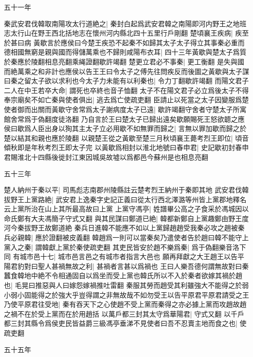 五十一年


秦武安君伐韓取南陽攻太行道絶之|{
	秦封白起爲武安君韓之南陽即河内野王之地班志太行山在野王西北括地志在懷州河内縣北四十五里行戶剛翻}
楚頃襄王疾病|{
	疾至於甚曰病}
黃歇言於應侯曰今楚王疾恐不起秦不如歸其太子太子得立其事秦必重而德相國無窮是親與國而得儲萬乘也不歸則咸陽布衣耳|{
	四十三年黃歇與楚太子爲質於秦應於陵翻相息亮翻乘䋲證翻歇許竭翻}
楚更立君必不事秦|{
	更工衡翻}
是失與國而絶萬乘之和非計也應侯以告王王曰令太子之傅先往問疾反而後圖之黃歇與太子謀曰秦之留太子欲以求利也今太子力未能有以利秦也|{
	令力丁翻歇許竭翻}
而陽文君子二人在中王若卒大命|{
	謂死也卒終也音子恤翻}
太子不在陽文君子必立爲後太子不得奉宗廟矣不如亡秦與使者俱出|{
	逃去爲亡使疏吏翻}
臣請止以死當之太子因變服爲楚使者御而出關而黃歇守舍常爲太子謝病度太子已遠|{
	歇許竭翻守舍者守楚太子所寓館舍常爲于偽翻度徒洛翻}
乃自言於王曰楚太子已歸出遠矣歇願賜死王怒欲聼之應侯曰歇爲人臣出身以狥其主太子立必用歇不如無罪而歸之|{
	言無以罪加歇而歸之於楚以結其和親也應於陵翻}
以親楚王從之黃歇至楚三月秋頃襄王薨考烈王即位|{
	頃音傾秋即是年秋考烈王即太子完}
以黃歇爲相封以淮北地號曰春申君|{
	史記歇初封春申君賜淮北十四縣後徙封江東因城吳故墟以爲都邑今蘇州是也相息亮翻}


五十三年

楚人納州于秦以平|{
	司馬彪志南郡州陵縣註云楚考烈王納州于秦即其地}
武安君伐韓拔野王上黨路絶|{
	武安君上逸秦字史記正義曰從太行西北澤潞等州皆上黨郡地釋名云上黨所治在山上其所最高故曰上黨}
上黨守馮亭|{
	姓譜畢公高之子食采於馮城因以命氏鄭有大夫馮簡子守式又翻}
與其民謀曰鄭道已絶|{
	韓都新鄭自上黨趣鄭由野王度河今秦拔野王故鄭道絶}
秦兵日進韓不能應不如以上黨歸趙趙受我秦必攻之趙被秦兵必親韓|{
	應於證翻被皮義翻}
韓趙爲一則可以當秦矣乃遣使者告於趙曰韓不能守上黨入之秦|{
	謂韓獻上黨於秦使疏吏翻}
其吏民皆安於趙不樂爲秦|{
	爲于偽翻樂音洛下同}
有城市邑十七|{
	城市邑言邑之有城市者指言大邑也}
願再拜獻之大王趙王以告平陽君豹對曰聖人甚禍無故之利|{
	甚禍者言甚以爲禍也}
王曰人樂吾德何謂無故對曰秦蠶食韓地中絶不令相通固自以爲坐而受上黨也韓氏所以不入於秦者欲嫁其禍於趙也|{
	毛晃曰推惡與人曰嫁怨嫁禍推吐雷翻}
秦服其勞而趙受其利雖強大不能得之於弱小弱小固能得之於強大乎豈得謂之非無故哉不如勿受王以告平原君平原君請受之王乃使平原君往受地|{
	秦有吞天下之心使趙不受上黨而秦得之亦必據上黨而攻趙故趙之禍不在於受上黨而在於用趙括}
以萬戶都三封其太守爲華陽君|{
	守式又翻}
以千戶都三封其縣令爲侯吏民皆益爵三級馮亭垂涕不見使者曰吾不忍賣主地而食之也|{
	使疏吏翻}


五十五年

